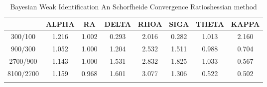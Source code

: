 \documentclass[a4paper,10pt]{article}
\begin{document}
\centering
\begin{longtable}{cccccccc}
\toprule
 & ALPHA & RA & DELTA & RHOA & SIGA & THETA & KAPPA \\
\midrule
300/100 & 1.216 & 1.002 & 0.293 & 2.016 & 0.282 & 1.013 & 2.160 \\
900/300 & 1.052 & 1.000 & 1.204 & 2.532 & 1.511 & 0.988 & 0.704 \\
2700/900 & 1.143 & 1.000 & 1.531 & 2.832 & 1.825 & 1.033 & 0.567 \\
8100/2700 & 1.159 & 0.968 & 1.601 & 3.077 & 1.306 & 0.522 & 0.502 \\
\bottomrule
\caption{Bayesian Weak Identification An Schorfheide Convergence Ratioshessian method}
\label{table:tbl:WeakAnSchoConvergenceRatios_hessian}
\end{longtable}
\end{document}
